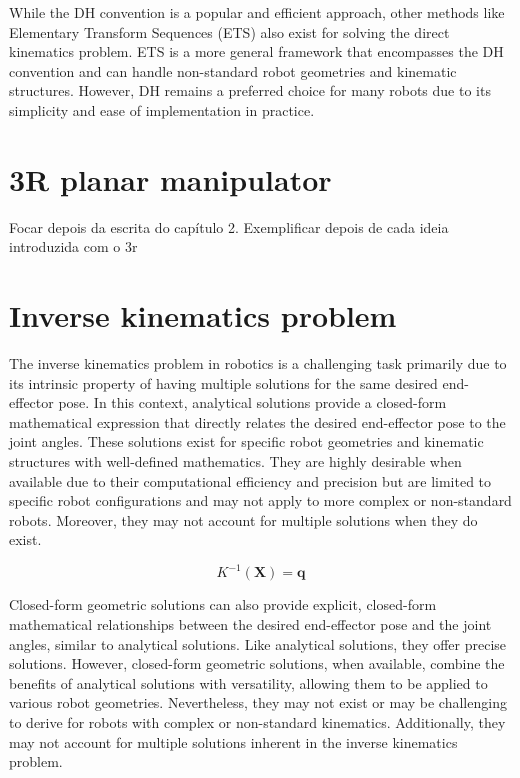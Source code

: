 While the DH convention is a popular and efficient approach, other methods like Elementary Transform Sequences (ETS) also exist for solving the direct kinematics problem. ETS is a more general framework that encompasses the DH convention and can handle non-standard robot geometries and kinematic structures. However, DH remains a preferred choice for many robots due to its simplicity and ease of implementation in practice.

\section{3R planar manipulator}

Focar depois da escrita do capítulo 2. Exemplificar depois de cada ideia introduzida com o 3r

\section{Inverse kinematics problem}

The inverse kinematics problem in robotics is a challenging task primarily due to its intrinsic property of having multiple solutions for the same desired end-effector pose. In this context, analytical solutions provide a closed-form mathematical expression that directly relates the desired end-effector pose to the joint angles. These solutions exist for specific robot geometries and kinematic structures with well-defined mathematics. They are highly desirable when available due to their computational efficiency and precision but are limited to specific robot configurations and may not apply to more complex or non-standard robots. Moreover, they may not account for multiple solutions when they do exist.

$$ K^{-1}(\boldsymbol{X}) = \boldsymbol{q} $$

Closed-form geometric solutions can also provide explicit, closed-form mathematical relationships between the desired end-effector pose and the joint angles, similar to analytical solutions. Like analytical solutions, they offer precise solutions. However, closed-form geometric solutions, when available, combine the benefits of analytical solutions with versatility, allowing them to be applied to various robot geometries. Nevertheless, they may not exist or may be challenging to derive for robots with complex or non-standard kinematics. Additionally, they may not account for multiple solutions inherent in the inverse kinematics problem.

